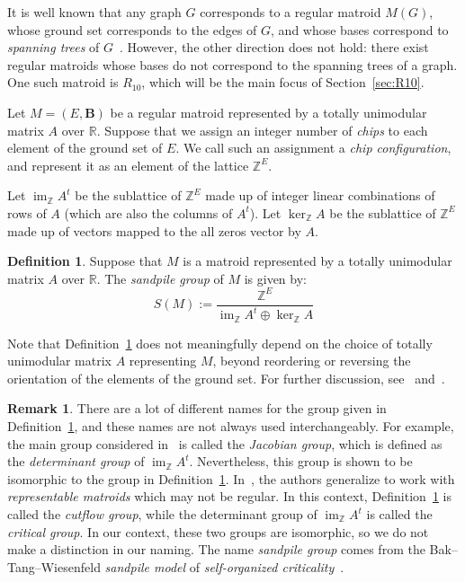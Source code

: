 \documentclass[12p]{amsart}
\numberwithin{equation}{section}
\theoremstyle{plain}
\theoremstyle{definition}
\newtheorem{defn}[thm]{Definition}
\newtheorem{remark}[thm]{Remark}
\newcommand{\Z}{\mathbb {Z}}
\newcommand{\mbf}{\mathbf}
\DeclareMathOperator{\im}{im}
\begin{document}
It is well known that any graph $G$ corresponds to a regular matroid $M(G)$, whose ground set corresponds to the edges of $G$, and whose bases correspond to \emph{spanning trees} of $G$~\cite[Section 5.1]{Oxley}. However, the other direction does not hold: there exist regular matroids whose bases do not correspond to the spanning trees of a graph. One such matroid is $R_{10}$, which will be the main focus of Section~\ref{sec:R10}. 

Let $M = (E,\mbf B)$ be a regular matroid represented by a totally unimodular matrix $A$ over $\mathbb R$. Suppose that we assign an integer number of \emph{chips} to each element of the ground set of $E$.  We call such an assignment a \emph{chip configuration}, and represent it as an element of the lattice $\Z^E$.

Let $\im_{\Z} A^t$ be the sublattice of $\Z^E$ made up of integer linear combinations of rows of $A$ (which are also the columns of $A^t$). Let $\ker_{\Z} A$ be the sublattice of $\Z^E$ made up of vectors mapped to the all zeros vector by $A$. 

\begin{defn}\label{def:sandpile}
    Suppose that $M$ is a matroid represented by a totally unimodular matrix $A$ over $\mathbb R$. The \emph{sandpile group} of $M$ is given by:
    \[S(M) := \frac{\Z^E}{\im_ {\Z} A^t\oplus \ker_ {\Z} A}\]
\end{defn}

Note that Definition~\ref{def:sandpile} does not meaningfully depend on the choice of totally unimodular matrix $A$ representing $M$, beyond reordering or reversing the orientation of the elements of the ground set. For further discussion, see~\cite[Section 2.1]{BBY} and~\cite{SuWagner}. 

\begin{remark}\label{rem:names}
    There are a lot of different names for the group given in Definition~\ref{def:sandpile}, and these names are not always used interchangeably. For example, the main group considered in~\cite{BBY} is called the \emph{Jacobian group}, which is defined as the \emph{determinant group} of $\im_ {\Z} A^t$. Nevertheless, this group is shown to be isomorphic to the group in Definition~\ref{def:sandpile}. In~\cite{CutsFlows}, the authors generalize to work with \emph{representable matroids} which may not be regular. In this context, Definition~\ref{def:sandpile} is called the \emph{cutflow group}, while the determinant group of $\im_{\Z} A^t$ is called the \emph{critical group}. In our context, these two groups are isomorphic, so we do not make a distinction in our naming. The name \emph{sandpile group} comes from the Bak--Tang--Wiesenfeld \emph{sandpile model} of \emph{self-organized criticality}~\cite{BTW}.
\end{remark}
\end{document}
